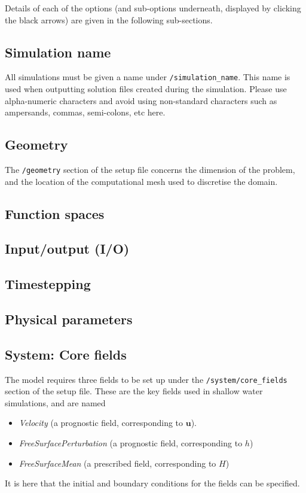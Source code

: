 \documentclass[a4paper,11pt]{report}
\begin{document}
Details of each of the options (and sub-options underneath, displayed by clicking the black arrows) are given in the following sub-sections.

\subsection{Simulation name}
All simulations must be given a name under \texttt{/simulation\_name}. This name is used when outputting solution files created during the simulation. Please use alpha-numeric characters and avoid using non-standard characters such as ampersands, commas, semi-colons, etc here.

\subsection{Geometry}
The \texttt{/geometry} section of the setup file concerns the dimension of the problem, and the location of the computational mesh used to discretise the domain.

\subsection{Function spaces}

\subsection{Input/output (I/O)}

\subsection{Timestepping}

\subsection{Physical parameters}

\subsection{System: Core fields}
The model requires three fields to be set up under the \texttt{/system/core\_fields} section of the setup file. These are the key fields used in shallow water simulations, and are named
\begin{itemize}
   \item \textit{Velocity} (a prognostic field, corresponding to $\mathbf{u}$).
   \item \textit{FreeSurfacePerturbation} (a prognostic field, corresponding to $h$)
   \item \textit{FreeSurfaceMean} (a prescribed field, corresponding to $H$)
\end{itemize}
It is here that the initial and boundary conditions for the fields can be specified.
\end{document}
